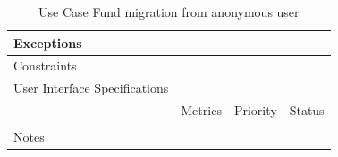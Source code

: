 \begin{table}[H]
\begin{tabularx}{\linewidth}{|l|X|X|X|}
            \hline Exceptions                    & \multicolumn{3}{l|}{}                                                                                 \\

            \hline Constraints                   & \multicolumn{3}{l|}{}                                                                                 \\

            \hline User Interface Specifications & \multicolumn{3}{l|}{}                                                                                 \\

            \hline \multirow{2}{*}{}             & Metrics                                                                           & Priority & Status \\
            \cline{2-4}                          &                                                                                   &          &        \\
            \hline Notes                         & \multicolumn{3}{l|}{}                                                                                 \\
            \hline
      \end{tabularx}
      \caption{Use Case Fund migration from anonymous user}
      \label{tab:use_case_fund_migration_from_anonymous_user}
\end{table}

